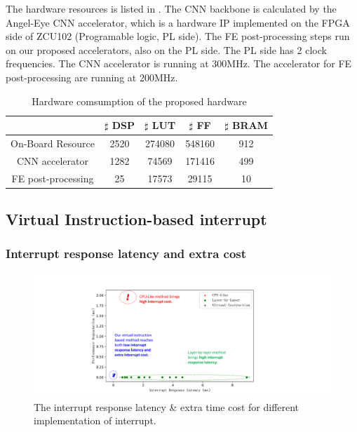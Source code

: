 The hardware resources is listed in . The CNN backbone is calculated by the Angel-Eye CNN accelerator\cite{guo2017angel}, which is a hardware IP implemented on the FPGA side of ZCU102 (Programable logic, PL side). The FE post-processing steps run on our proposed accelerators, also on the PL side. The PL side has 2 clock frequencies. The CNN accelerator is running at 300MHz. The accelerator for FE post-processing are running at 200MHz.

\begin{table}[t]
  \centering
  \caption{Hardware comsumption of the proposed hardware}
\begin{tabular}{|c|c|c|c|c|}
  \hline
        & $\sharp$ DSP & $\sharp$ LUT & $\sharp$ FF & $\sharp$ BRAM \bigstrut\\
  \hline
  On-Board Resource &   2520   &  274080      &  548160     & 912 \bigstrut\\
  \hline
  CNN accelerator &   1282   &  74569      &   171416    & 499 \bigstrut\\
  \hline
  FE post-processing & 25      &  17573     &   29115    & 10 \bigstrut\\
  \hline
  \end{tabular}%
  
  \label{tab:hardware}%
\end{table}%


\subsection{Virtual Instruction-based interrupt }

\subsubsection{ Interrupt response latency and extra cost}

\begin{figure}[t]
  \centering
  \includegraphics[width=0.9\linewidth]{fig/scatter1024.pdf}
  \caption{The interrupt response latency \& extra time cost for different implementation of interrupt. }
  \label{fig:scatter1024}
\end{figure}

